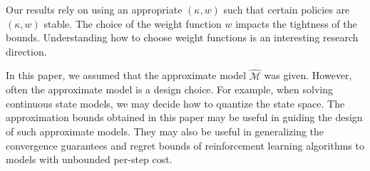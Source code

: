\documentclass[letterpaper, 10pt]{IEEEtran}
\newcommand*\ALPHABET{\mathcal}
\newcommand*\tuple{\kappa, w}
\begin{document}
  Our results rely on using an appropriate $(\tuple)$ such that certain policies are $(\tuple)$ stable. The choice of the weight function $w$ impacts the tightness of the bounds.  Understanding how to choose weight functions is an interesting research direction. 

  In this paper, we assumed that the approximate model $\hat {\ALPHABET M}$ was given. However, often the approximate model is a design choice. For example, when solving continuous state models, we may decide how to quantize the state space. The approximation bounds obtained in this paper may be useful in guiding the design of such approximate models. They may also be useful in generalizing the convergence guarantees and regret bounds of reinforcement learning algorithms to models with unbounded per-step cost.


\end{document}
